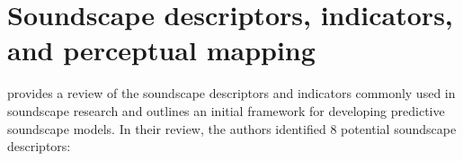 


\section{Soundscape descriptors, indicators, and perceptual mapping}
\citet{Aletta2016Soundscape} provides a review of the soundscape descriptors and indicators commonly used in soundscape research and outlines an initial framework for developing predictive soundscape models. In their review, the authors identified 8 potential soundscape descriptors:

